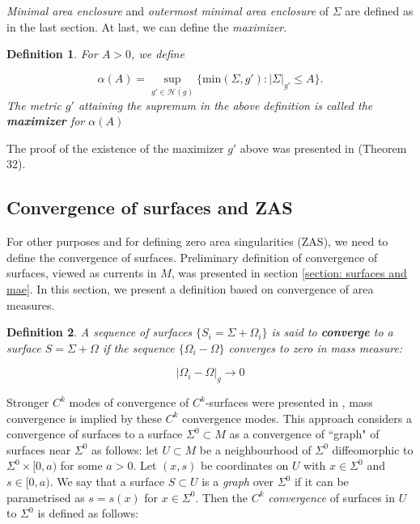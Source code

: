\documentclass{amsart}
\newcommand{\s}{\Sigma}
\newcommand{\gh}{\overline{\mathcal{H}(g)}}
\newtheorem{definition}{Definition}
\theoremstyle{named}
\begin{document}
\textit{Minimal area enclosure} and \textit{outermost minimal area enclosure} of $\s$ are defined as in the last section. At last, we can define the \textit{maximizer}.

\begin{definition}
    For $A>0$, we define 

    \begin{equation*}
        \alpha(A) = \sup\limits_{g' \in \gh} \{ \text{min}(\s,g'): |\s|_{g'} \leq A \}.
    \end{equation*}
    The metric $g'$ attaining the supremum in the above definition is called the \textbf{maximizer} for $\alpha(A)$
\end{definition}

The proof of the existence of the maximizer $g'$ above was presented in \cite{jeff} (Theorem 32).



\subsection{Convergence of surfaces and ZAS} \label{section: convergence and ZAS}

For other purposes and for defining zero area singularities (ZAS), we need to define the convergence of surfaces. Preliminary definition of convergence of surfaces, viewed as currents in $M$, was presented in section \ref{section: surfaces and mae}. In this section, we present a definition based on convergence of area measures.

\begin{definition}
    A sequence of surfaces $\{S_i = \s + \Omega_i\}$ is said to \textbf{converge} to a surface $S = \s + \Omega$ if the sequence $\{ \Omega_i - \Omega \}$ converges to zero in mass measure:

    \begin{equation*}
        |\Omega_i - \Omega|_g \rightarrow 0 
    \end{equation*}
    
\end{definition}

Stronger $C^k$ modes of convergence of $C^k$-surfaces were presented in \cite{Bray:2009voj}, mass convergence is implied by these $C^k$ convergence modes. This approach considers a convergence of surfaces to a surface $\s^{0} \subset M$ as a convergence of ``graph" of surfaces near $\s^{0}$ as follows: let $U \subset M$ be a neighbourhood of $\s^{0}$ diffeomorphic to $\s^{0} \times [0,a)$ for some $a > 0$. Let $(x,s)$ be coordinates on $U$ with $x \in \s^{0}$ and $s \in [0,a)$. We say that a surface $S \subset U$ is a \textit{graph} over $\s^{0}$ if it can be parametrised as $s = s(x)$ for $x \in \s^{0}$. Then the $C^k$ \textit{convergence} of surfaces in $U$ to $\s^{0}$ is defined as follows:
\end{document}
